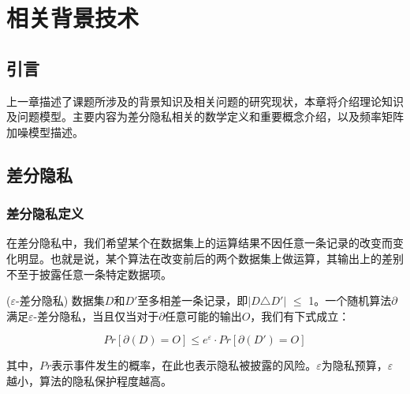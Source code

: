 


\chapter{相关背景技术}
\label{chap:background}

\section{引言}

上一章描述了课题所涉及的背景知识及相关问题的研究现状，本章将介绍理论知识及问题模型。主要内容为差分隐私相关的数学定义和重要概念介绍，以及频率矩阵加噪模型描述。

\section{差分隐私}

\subsection{差分隐私定义}

在差分隐私中，我们希望某个在数据集上的运算结果不因任意一条记录的改变而变化明显。也就是说，某个算法在改变前后的两个数据集上做运算，其输出上的差别不至于披露任意一条特定数据项。

\begin{defn}
	
($\varepsilon$\textsc{-差分隐私})\cite{Dwork Calibrating} 数据集$D$和$D'$至多相差一条记录，即$|D$$\triangle$$D'|$ $\leqslant$ 1。一个随机算法$\partial$满足$\varepsilon$-差分隐私，当且仅当对于$\partial$任意可能的输出$O$，我们有下式成立：

\begin{equation}
  \label{eq:res1}
	 Pr[\partial(D) = O] \leqslant e^{\varepsilon} \cdot Pr[\partial(D') = O]
\end{equation}


其中，$Pr$表示事件发生的概率，在此也表示隐私被披露的风险。$\varepsilon$为隐私预算，$\varepsilon$越小，算法的隐私保护程度越高。

\end{defn}

